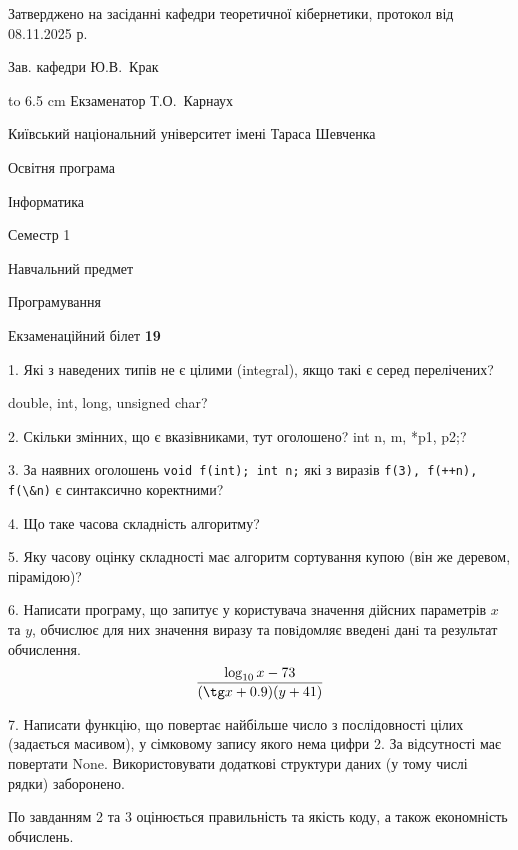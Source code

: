 \documentclass[12pt, ukrainian]{article}
\def\code#1{\Verb!#1!}
\begin{document}
{\smallskip\smallskip \begin {scriptsize} Затверджено на засіданні кафедри теоретичної кібернетики, протокол   від   08.11.2025 р.\par\smallskip\smallskip\smallskip\smallskip
{\parbox {6.5 cm} {Зав. кафедри \dotfill Ю.В.~Крак}}\hspace {0.7cm} {\hbox to 6.5 cm { Екзаменатор \dotfill Т.О.~Карнаух}} \end{scriptsize}}
\newpage
{{\begin {scriptsize}\par
{ \center  Київський національний університет імені Тараса Шевченка \par}
{\parbox {5 cm}{Освітня програма \hfill}{\parbox {7 cm}{Інформатика\hfill}}\parbox {6 cm}{\hfill Семестр 1}}\par
{\parbox {5 cm} {Навчальний предмет \hfill}\parbox {7 cm}{Програмування \hfill}\parbox {6cm}{\hfill}\par}\vspace{-15pt} \end{scriptsize}}{\center Екзаменаційний білет \No \textbf { 19 }\par}}
{%
1. Які з наведених типів не є цілими (integral), якщо такі є серед перелічених?

double, int, long, unsigned char?
\par
\vspace{2mm}
2. Скільки змінних, що є вказівниками, тут оголошено?
int n, m, *p1, p2;?
\par
\vspace{2mm}
3. За наявних оголошень \code{void f(int); int n;} які з виразів \code{f(3), f(++n), f(\&n)} є синтаксично коректними?
\par
\vspace{2mm}
4. Що таке часова складність алгоритму?
\par
\vspace{2mm}
5. Яку часову оцінку складності має алгоритм сортування купою (він же деревом, пірамідою)?
\par
\vspace{2mm}
6. Написати програму, що запитує у користувача значення дійсних параметрів $x$ та $y$, обчислює для них значення виразу та повiдомляє введенi данi та результат обчислення.
$$\frac{\log_{10} x - 73}{(\tg x + 0.9) (y + 41)}$$ 

\par
7. Написати функцію, що повертає найбільше число з послідовності цілих (задається масивом), у сімковому запису якого нема цифри 2. За відсутності має повертати None. Використовувати додаткові структури даних (у тому числі рядки) заборонено.

По завданням 2 та 3 оцінюється правильність та якість коду, а також економність обчислень.

}
\end{document}
